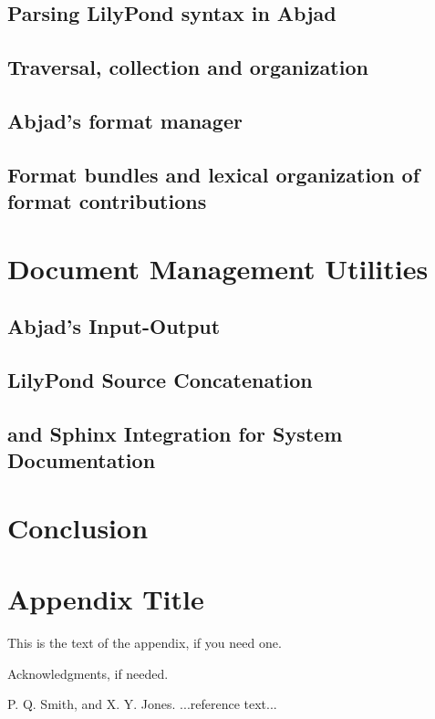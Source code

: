 \documentclass{sigplanconf}
\begin{document}
\subsection{Parsing LilyPond syntax in Abjad}

\subsection{Traversal, collection and organization}

\subsection{Abjad's format manager}

\subsection{Format bundles and lexical organization of format contributions}

\section{Document Management Utilities}

\subsection{Abjad's Input-Output}

\subsection{LilyPond Source Concatenation}

\subsection{\latex and Sphinx Integration for System Documentation}

\section{Conclusion}

\appendix
\section{Appendix Title}

This is the text of the appendix, if you need one.

\acks

Acknowledgments, if needed.





\begin{thebibliography}{}
\softraggedright

P. Q. Smith, and X. Y. Jones. ...reference text...

\end{thebibliography}
\end{document}
